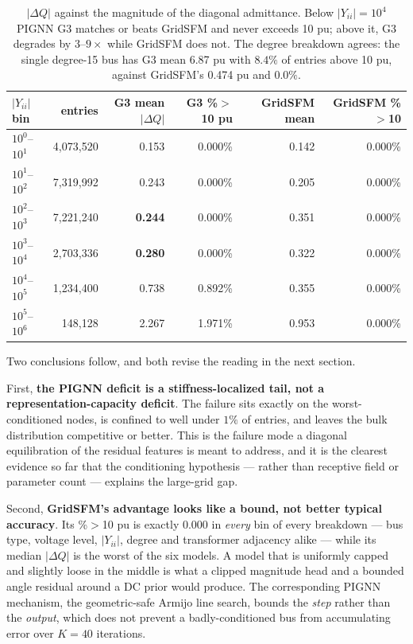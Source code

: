 \documentclass[10pt]{article}
\begin{document}
\begin{table}[H]
\centering\footnotesize
\begin{tabular}{lrrrrr}
\toprule
$|Y_{ii}|$ bin & entries & G3 mean $|\Delta Q|$ & G3 \%$>$10 pu & GridSFM mean & GridSFM \%$>$10\\
\midrule
$10^{0}$--$10^{1}$ & 4{,}073{,}520 & 0.153 & 0.000\% & 0.142 & 0.000\%\\
$10^{1}$--$10^{2}$ & 7{,}319{,}992 & 0.243 & 0.000\% & 0.205 & 0.000\%\\
$10^{2}$--$10^{3}$ & 7{,}221{,}240 & \textbf{0.244} & 0.000\% & 0.351 & 0.000\%\\
$10^{3}$--$10^{4}$ & 2{,}703{,}336 & \textbf{0.280} & 0.000\% & 0.322 & 0.000\%\\
$10^{4}$--$10^{5}$ & 1{,}234{,}400 & 0.738 & 0.892\% & 0.355 & 0.000\%\\
$10^{5}$--$10^{6}$ & 148{,}128 & 2.267 & 1.971\% & 0.953 & 0.000\%\\
\bottomrule
\end{tabular}
\caption{$|\Delta Q|$ against the magnitude of the diagonal admittance.  Below
$|Y_{ii}|=10^{4}$ PIGNN G3 matches or beats GridSFM and never exceeds 10 pu;
above it, G3 degrades by $3$--$9\times$ while GridSFM does not.  The degree
breakdown agrees: the single degree-15 bus has G3 mean 6.87 pu with $8.4\%$ of
entries above 10 pu, against GridSFM's 0.474 pu and $0.0\%$.}
\end{table}

Two conclusions follow, and both revise the reading in the next section.

First, \textbf{the PIGNN deficit is a stiffness-localized tail, not a
representation-capacity deficit}.  The failure sits exactly on the
worst-conditioned nodes, is confined to well under $1\%$ of entries, and leaves
the bulk distribution competitive or better.  This is the failure mode a
diagonal equilibration of the residual features is meant to address, and it is
the clearest evidence so far that the conditioning hypothesis --- rather than
receptive field or parameter count --- explains the large-grid gap.

Second, \textbf{GridSFM's advantage looks like a bound, not better typical
accuracy}.  Its \%$>$10 pu is exactly $0.000$ in \emph{every} bin of every
breakdown --- bus type, voltage level, $|Y_{ii}|$, degree and transformer
adjacency alike --- while its median $|\Delta Q|$ is the worst of the six
models.  A model that is uniformly capped and slightly loose in the middle is
what a clipped magnitude head and a bounded angle residual around a DC prior
would produce.  The corresponding PIGNN mechanism, the geometric-safe Armijo
line search, bounds the \emph{step} rather than the \emph{output}, which does
not prevent a badly-conditioned bus from accumulating error over $K=40$
iterations.
\end{document}
